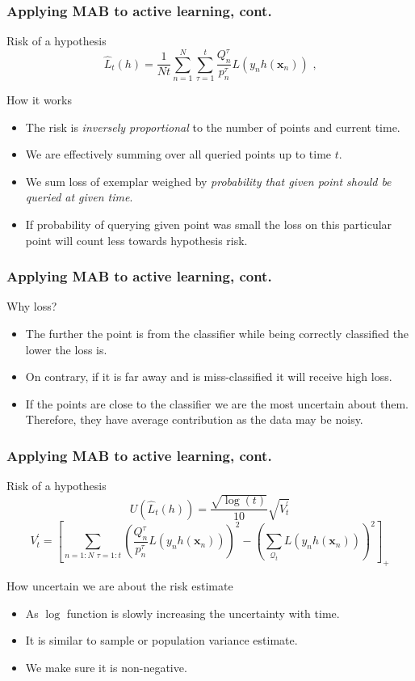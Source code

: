 \documentclass{beamer}
\begin{document}
  \begin{frame}
  \frametitle{Applying MAB to active learning, cont.}
  \begin{alertblock}{Risk of a hypothesis}
  $$
  \hat{L}_t(h) = \frac{1}{Nt} \sum_{n=1}^{N} \sum_{\tau = 1}^{t} 
\frac{Q^{\tau}_n}{p^{\tau}_n} L(y_n h(\mathbf{x}_n)) \text{~,}
  $$
  \end{alertblock}
  \begin{exampleblock}{How it works}
    \begin{itemize}
      \item The risk is \emph{inversely proportional} to the number of points and current time.
      \item We are effectively summing over all queried points up to time $t$.
      \item We sum loss of exemplar weighed by \emph{probability that given point should be queried at given time}.
      \item If probability of querying given point was small the loss on this particular point will count less towards hypothesis risk.
    \end{itemize}
  \end{exampleblock}
  \end{frame}
  \begin{frame}
  \frametitle{Applying MAB to active learning, cont.}
  \begin{block}{Why loss?}
    \begin{itemize}
      \item The further the point is from the classifier while being correctly classified the lower the loss is.
      \item On contrary, if it is far away and is miss-classified it will receive high loss.
      \item If the points are close to the classifier we are the most uncertain about them. Therefore, they have average contribution as the data may be noisy.
    \end{itemize}
  \end{block}
  \end{frame}
  \begin{frame}
  \frametitle{Applying MAB to active learning, cont.}
  \begin{alertblock}{Risk of a hypothesis}
  $$U(\hat{L}_t(h)) = \frac{ \sqrt{ \log(t) } }
                       { 10 }
                  \sqrt{ V^\prime_t }$$
  $$V^\prime_t = \left[
  \sum_{n = 1:N \text{~} \tau = 1:t} \left( \frac{Q^\tau_n}{p^\tau_n} L(y_n h(\mathbf{x}_n)) \right)^2
  -
  \left( \sum_{\mathscr{Q}_t} L(y_n h(\mathbf{x}_n)) \right)^2
\right]_+$$
  \end{alertblock}
  \begin{block}{How uncertain we are about the risk estimate}
    \begin{itemize}
      \item As $\log$ function is slowly increasing the uncertainty with time.
      \item It is similar to sample or population variance estimate.
      \item We make sure it is non-negative.
    \end{itemize}
  \end{block}
  \end{frame}
\end{document}
